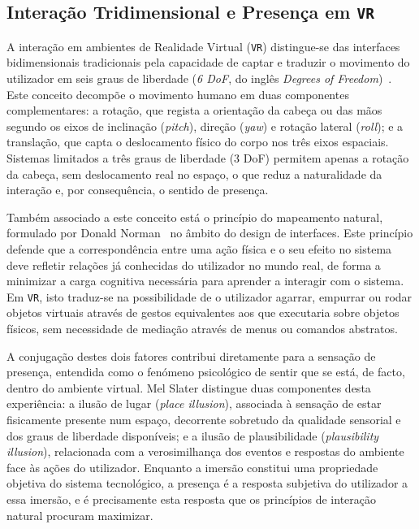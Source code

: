 \documentclass[a4paper, 12pt]{book}
\begin{document}
\subsection{Interação Tridimensional e Presença em \texttt{VR}}
\label{subsec:interacao_presenca}
A interação em ambientes de Realidade Virtual (\texttt{VR}) distingue-se das interfaces 
bidimensionais tradicionais pela capacidade de captar e traduzir o movimento 
do utilizador em seis graus de liberdade (\textit{6 DoF}, do inglês 
\textit{Degrees of Freedom})~\cite{sixdof}. Este conceito decompõe o movimento humano em 
duas componentes complementares: a rotação, que regista a orientação da 
cabeça ou das mãos segundo os eixos de inclinação (\textit{pitch}), direção 
(\textit{yaw}) e rotação lateral (\textit{roll}); e a translação, que capta 
o deslocamento físico do corpo nos três eixos espaciais. Sistemas limitados 
a três graus de liberdade (3 DoF) permitem apenas a rotação da cabeça, sem 
deslocamento real no espaço, o que reduz a naturalidade da interação e, por 
consequência, o sentido de presença.
\par
Também associado a este conceito está o princípio do mapeamento 
natural, formulado por Donald Norman~\cite{norman} no âmbito do design de interfaces. 
Este princípio defende que a correspondência entre uma ação física e o seu 
efeito no sistema deve refletir relações já conhecidas do utilizador no 
mundo real, de forma a  minimizar a carga cognitiva necessária para aprender a 
interagir com o sistema. Em \texttt{VR}, isto traduz-se na possibilidade de 
o utilizador agarrar, empurrar ou rodar objetos virtuais através de gestos 
equivalentes aos que executaria sobre objetos físicos, sem necessidade de 
mediação através de menus ou comandos abstratos.
\par
A conjugação destes dois fatores contribui diretamente para a sensação de 
presença, entendida como o fenómeno psicológico de sentir que se está, de 
facto, dentro do ambiente virtual. Mel Slater distingue duas componentes 
desta experiência: a ilusão de lugar (\textit{place illusion}), associada à 
sensação de estar fisicamente presente num espaço, decorrente sobretudo da 
qualidade sensorial e dos graus de liberdade disponíveis; e a ilusão de 
plausibilidade (\textit{plausibility illusion}), relacionada com a 
verosimilhança dos eventos e respostas do ambiente face às ações do 
utilizador. Enquanto a imersão constitui uma propriedade objetiva do 
sistema tecnológico, a presença é a resposta subjetiva do utilizador a essa 
imersão, e é precisamente esta resposta que os princípios de interação 
natural procuram maximizar.
\par
\end{document}
